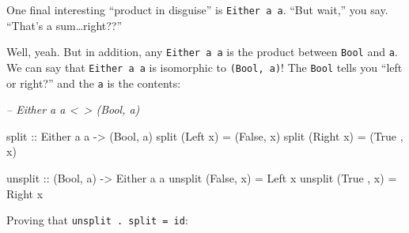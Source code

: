 \documentclass[]{article}
\newenvironment{Shaded}{}{}
\newcommand{\CommentTok}[1]{\textcolor[rgb]{0.38,0.63,0.69}{\textit{#1}}}
\newcommand{\DataTypeTok}[1]{\textcolor[rgb]{0.56,0.13,0.00}{#1}}
\newcommand{\FunctionTok}[1]{\textcolor[rgb]{0.02,0.16,0.49}{#1}}
\newcommand{\NormalTok}[1]{#1}
\newcommand{\OtherTok}[1]{\textcolor[rgb]{0.00,0.44,0.13}{#1}}
\begin{document}
One final interesting ``product in disguise'' is \texttt{Either\ a\ a}. ``But
wait,'' you say. ``That's a sum\ldots{}right??''

Well, yeah. But in addition, any \texttt{Either\ a\ a} is the product between
\texttt{Bool} and \texttt{a}. We can say that \texttt{Either\ a\ a} is
isomorphic to \texttt{(Bool,\ a)}! The \texttt{Bool} tells you ``left or
right?'' and the \texttt{a} is the contents:

\begin{Shaded}
\begin{Highlighting}[]
\CommentTok{-- Either a a <~> (Bool, a)}

\OtherTok{split ::} \DataTypeTok{Either}\NormalTok{ a a }\OtherTok{->}\NormalTok{ (}\DataTypeTok{Bool}\NormalTok{, a)}
\NormalTok{split (}\DataTypeTok{Left}\NormalTok{  x) }\FunctionTok{=}\NormalTok{ (}\DataTypeTok{False}\NormalTok{, x)}
\NormalTok{split (}\DataTypeTok{Right}\NormalTok{ x) }\FunctionTok{=}\NormalTok{ (}\DataTypeTok{True}\NormalTok{ , x)}

\OtherTok{unsplit ::}\NormalTok{ (}\DataTypeTok{Bool}\NormalTok{, a) }\OtherTok{->} \DataTypeTok{Either}\NormalTok{ a a}
\NormalTok{unsplit (}\DataTypeTok{False}\NormalTok{, x) }\FunctionTok{=} \DataTypeTok{Left}\NormalTok{  x}
\NormalTok{unsplit (}\DataTypeTok{True}\NormalTok{ , x) }\FunctionTok{=} \DataTypeTok{Right}\NormalTok{ x}
\end{Highlighting}
\end{Shaded}

Proving that \texttt{unsplit\ .\ split\ =\ id}:
\end{document}
